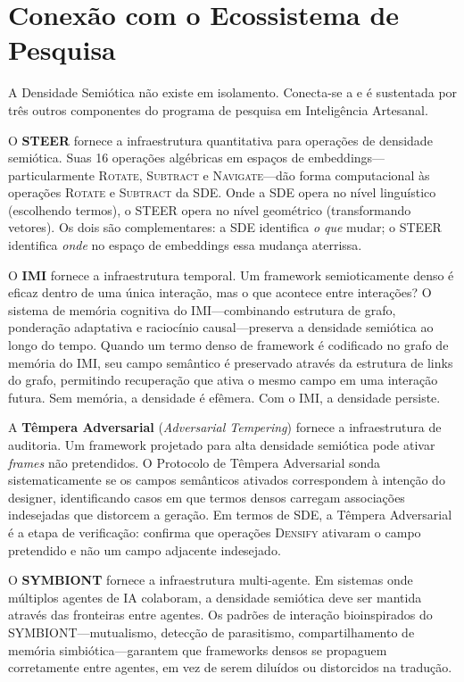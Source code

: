 \documentclass[12pt,a4paper]{article}
\begin{document}
\section{Conexão com o Ecossistema de Pesquisa}
\label{sec:ecosystem}

A Densidade Semiótica não existe em isolamento.
Conecta-se a e é sustentada por três outros componentes do programa de pesquisa em Inteligência Artesanal.

O \textbf{STEER} \cite{gomes2026steer} fornece a infraestrutura quantitativa para operações de densidade semiótica.
Suas 16 operações algébricas em espaços de embeddings---particularmente \textsc{Rotate}, \textsc{Subtract} e \textsc{Navigate}---dão forma computacional às operações \textsc{Rotate} e \textsc{Subtract} da SDE.
Onde a SDE opera no nível linguístico (escolhendo termos), o STEER opera no nível geométrico (transformando vetores).
Os dois são complementares: a SDE identifica \textit{o que} mudar; o STEER identifica \textit{onde} no espaço de embeddings essa mudança aterrissa.

O \textbf{IMI} \cite{gomes2026imi,gomes2026imitheory} fornece a infraestrutura temporal.
Um framework semioticamente denso é eficaz dentro de uma única interação, mas o que acontece entre interações?
O sistema de memória cognitiva do IMI---combinando estrutura de grafo, ponderação adaptativa e raciocínio causal---preserva a densidade semiótica ao longo do tempo.
Quando um termo denso de framework é codificado no grafo de memória do IMI, seu campo semântico é preservado através da estrutura de links do grafo, permitindo recuperação que ativa o mesmo campo em uma interação futura.
Sem memória, a densidade é efêmera.
Com o IMI, a densidade persiste.

A \textbf{Têmpera Adversarial} (\textit{Adversarial Tempering}) \cite{gomes2026founding} fornece a infraestrutura de auditoria.
Um framework projetado para alta densidade semiótica pode ativar \textit{frames} não pretendidos.
O Protocolo de Têmpera Adversarial sonda sistematicamente se os campos semânticos ativados correspondem à intenção do designer, identificando casos em que termos densos carregam associações indesejadas que distorcem a geração.
Em termos de SDE, a Têmpera Adversarial é a etapa de verificação: confirma que operações \textsc{Densify} ativaram o campo pretendido e não um campo adjacente indesejado.

O \textbf{SYMBIONT} \cite{gomes2026symbiont} fornece a infraestrutura multi-agente.
Em sistemas onde múltiplos agentes de IA colaboram, a densidade semiótica deve ser mantida através das fronteiras entre agentes.
Os padrões de interação bioinspirados do SYMBIONT---mutualismo, detecção de parasitismo, compartilhamento de memória simbiótica---garantem que frameworks densos se propaguem corretamente entre agentes, em vez de serem diluídos ou distorcidos na tradução.
\end{document}
